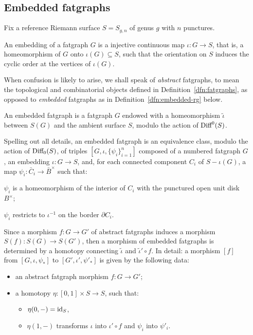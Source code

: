 \subsection{Embedded fatgraphs}
\label{sec:embedded-rg}

Fix a reference Riemann surface $S = S_{g,n}$ of genus $g$ with $n$
punctures.

An embedding of a fatgraph $G$ is a injective continuous map $\iota:G\to
S$, that is, a homeomorphism of $G$ onto $\iota(G) \subseteq S$, such that the
orientation on $S$ induces the cyclic order at the vertices of $\iota(G)$.

When confusion is likely to arise, we shall speak of \emph{abstract}
fatgraphs, to mean the topological and combinatorial objects
defined in Definition~\ref{dfn:fatgraphs}, as opposed to \emph{embedded}
fatgraphs as in Definition~\ref{dfn:embedded-rg} below.

\begin{definition}\label{dfn:embedded-rg}
  An embedded fatgraph is a fatgraph $G$ endowed with a
  homeomorphism ${\tilde \iota}$ between $S(G)$ and the ambient
  surface $S$, modulo the action of $\textrm{Diff}^0(S)$.
\end{definition}
Spelling out all details, an embedded fatgraph is an equivalence
class, modulo the action of $\textrm{Diff}_0(S)$, of triples $[G, \iota,
\{\psi_i\}_{i=1}^n]$ composed of a numbered fatgraph $G$, an
embedding $\iota:G\to S$, and, for each connected component $C_i$ of
$S - \iota(G)$, a map $\psi_i: {\bar C_i} \to {\bar B}^\times$ such
that:
\begin{inparaenum}[\slshape (1)]
\item $\psi_i$ is a homeomorphism of the interior of $C_i$ with the
  punctured open unit disk $B^\times$;
\item $\psi_i$ restricts to $\iota^{-1}$ on the border $\partial C_i$.
\end{inparaenum}

Since a morphism $f:G\to G'$ of abstract fatgraphs induces a morphism
$S(f):S(G)\to S(G')$, then a morphism of embedded fatgraphs is
determined by a homotopy connecting ${\tilde \iota}$ and ${\tilde
  \iota' \circ f}$.  In detail: a morphism $[f]$ from $[G, \iota,
\psi_*]$ to $[G', \iota', \psi'_*]$ is given by the following data:
\begin{itemize}
\item an abstract fatgraph morphism $f:G\to G'$;
\item a homotopy $\eta:[0,1] \times S\to S$, such that:
  \begin{itemize}
  \item $\eta(0,-) = \operatorname{id}_S$,
  \item $\eta(1,-)$ transforms $\iota$ into $\iota' \circ f$
    and $\psi_i$ into $\psi'_i$.
  \end{itemize}

\end{itemize}

